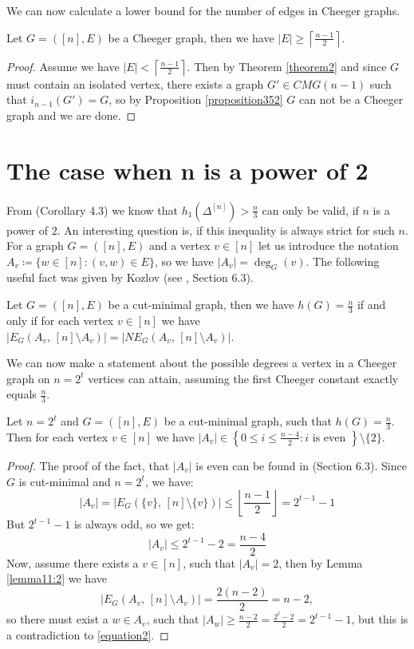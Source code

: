 We can now calculate a lower bound for the number of edges in Cheeger graphs.

\begin{prop}
Let \(G=([n],E)\) be a Cheeger graph, then we have \(|E|\geq\left\lceil\frac{n-1}{2}\right\rceil\).
\begin{proof}
Assume we have \(|E|<\left\lceil\frac{n-1}{2}\right\rceil\). Then by Theorem \ref{theorem2} and since \(G\) must contain an isolated vertex, there exists a graph \(G'\in CMG(n-1)\) such that \(i_{n-1}(G')=G\), so by Proposition \ref{proposition352} \(G\) can not be a Cheeger graph and we are done.
\end{proof}
\end{prop}

\section{The case when n is a power of 2}

From \cite{1} (Corollary 4.3) we know that \(h_1(\Delta^{[n]})>\frac{n}{3}\) can only be valid, if \(n\) is a power of \(2\). An interesting question is, if this inequality is always strict for such \(n\). For a graph \(G=([n],E)\) and a vertex \(v\in [n]\) let us introduce the notation\\
\(A_v\coloneqq \{w\in [n]:(v,w)\in E\}\), so we have \(|A_v|=\deg_G(v)\). The following useful fact was given by Kozlov (see \cite{1}, Section 6.3).

\begin{lem}\label{lemma11:2}
Let \(G=([n],E)\) be a cut-minimal graph, then we have \(h(G)=\frac{n}{3}\) if and only if for each vertex \(v\in [n]\) we have \(|E_G(A_v\text{, }[n]\setminus A_v)|=|NE_G(A_v\text{, }[n]\setminus A_v)|\).
\end{lem}

We can now make a statement about the possible degrees a vertex in a Cheeger graph on \(n=2^t\) vertices can attain, assuming the first Cheeger constant exactly equals \(\frac{n}{3}\).

\begin{prop}\label{proposition321}
Let \(n=2^t\) and \(G=([n],E)\) be a cut-minimal graph, such that \(h(G)=\frac{n}{3}\). Then for each vertex \(v\in [n]\) we have \(|A_v|\in\left\{0\leq i\leq\frac{n-4}{2}:i\text{ is even }\right\}\setminus\{2\}\).
\begin{proof}
The proof of the fact, that \(|A_v|\) is even can be found in \cite{1} (Section 6.3). Since \(G\) is cut-minimal and \(n=2^t\), we have:
\[
|A_v|=|E_G(\{v\}\text{, }[n]\setminus\{v\})|\leq\left\lfloor\frac{n-1}{2}\right\rfloor=2^{t-1}-1
\]
But \(2^{t-1}-1\) is always odd, so we get:
\begin{equation}\label{equation2}
|A_v|\leq 2^{t-1}-2=\frac{n-4}{2}
\end{equation}
Now, assume there exists a \(v\in [n]\), such that \(|A_v|=2\), then by Lemma \ref{lemma11:2} we have
\[
|E_G(A_v\text{, }[n]\setminus A_v)|=\frac{2(n-2)}{2}=n-2,
\]
so there must exist a \(w\in A_v\), such that \(|A_w|\geq\frac{n-2}{2}=\frac{2^t-2}{2}=2^{t-1}-1\), but this is a contradiction to \ref{equation2}.
\end{proof}
\end{prop}


